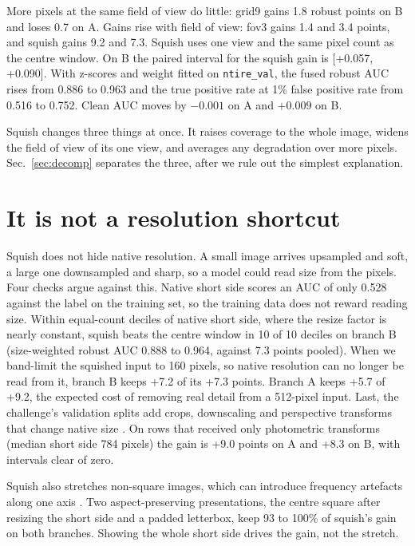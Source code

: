 \documentclass[letterpaper]{article} %
\begin{document}
More pixels at the same field of view do little: grid9 gains 1.8 robust
points on B and loses 0.7 on A. Gains rise with field of view: fov3 gains 1.4
and 3.4 points, and squish gains 9.2 and 7.3. Squish uses one view and the
same pixel count as the centre window. On B the paired interval for the
squish gain is [+0.057, +0.090]. With z-scores and weight fitted on
\texttt{ntire\_val}, the fused robust AUC rises from 0.886 to 0.963 and the
true positive rate at 1\% false positive rate from 0.516 to 0.752. Clean AUC
moves by $-0.001$ on A and $+0.009$ on B.

Squish changes three things at once. It raises coverage to the whole
image, widens the field of view of its one view, and averages any degradation
over more pixels. Sec.~\ref{sec:decomp} separates the three, after we rule out
the simplest explanation.

\section{It is not a resolution shortcut}
\label{sec:controls}

Squish does not hide native resolution. A small image arrives upsampled and
soft, a large one downsampled and sharp, so a model could read size from the
pixels. Four checks argue against this. Native short side scores an AUC of
only 0.528 against the label on the training set, so the training data does
not reward reading size. Within equal-count deciles of native short side,
where the resize factor is nearly constant, squish beats the centre window in
10 of 10 deciles on branch B (size-weighted robust AUC 0.888 to 0.964, against
7.3 points pooled). When we band-limit the squished input to 160 pixels, so
native resolution can no longer be read from it, branch B keeps +7.2 of its
+7.3 points. Branch A keeps +5.7 of +9.2, the expected cost of removing real
detail from a 512-pixel input. Last, the challenge's validation splits add
crops, downscaling and perspective transforms that change native size
\cite{gushchin2026ntire}. On rows that received only photometric transforms
(median short side 784 pixels) the gain is +9.0 points on A and +8.3 on B,
with intervals clear of zero.

Squish also stretches non-square images, which can introduce frequency
artefacts along one axis \cite{grommelt2024fakeorjpeg}. Two
aspect-preserving presentations, the centre square after resizing the short
side and a padded letterbox, keep 93 to 100\% of squish's gain on both
branches. Showing the whole short side drives the gain, not the stretch.
\end{document}
